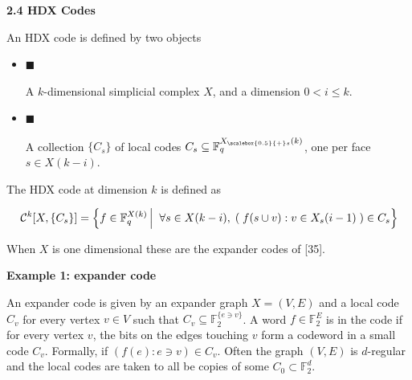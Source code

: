 \documentclass[10pt,a4paper]{article}
\begin{document}
\par\medskip\noindent\textbf{
2.4 HDX Codes}\par




An HDX code is defined by two objects\par


\begin{itemize}


\item[] 
$\blacksquare$ 


A $k$-dimensional simplicial complex $X$, and a dimension $0<i\leq k$.\par





\item[] 
$\blacksquare$ 


A collection $\{C_{s}\}$ of local codes $C_{s}\subseteq\mathbb{F}_{q}^{{X}_{\scalebox{0.5}{+}s}(k)}$, one per face $s\in X(k-i)$.\par





\end{itemize}


The HDX code at dimension $k$ is defined as\par


\[\begin{gathered}
{\cal C}^{k}[X,\{C_{s}\}]=\left\{f\in\mathbb{F}_{q}^{X(k)}\left|\;\vphantom{f\in\mathbb{F}_{q}^{X(k)}\forall s\in X(k-i),\;(\;f(s\cup v):v\in X_{s}(i-1)\;)\in C_{s}}\right.\forall s\in X(k-i),\;(\;f(s\cup v):v\in X_{s}(i-1)\;)\in C_{s}\right\}
\end{gathered}\]


When $X$ is one dimensional these are the expander codes of [35].\par




\par\medskip\noindent\textbf{Example 1: expander code}\par




An expander code is given by an expander graph $X=(V,E)$ and a local code $C_{v}$ for every vertex $v\in V$ such that $C_{v}\subseteq\mathbb{F}_{2}^{\{e\ni v\}}$. A word $f\in\mathbb{F}_{2}^{E}$ is in the code if for every vertex $v$, the bits on the edges touching $v$ form a codeword in a small code $C_{v}$. Formally, if $(f(e):e\ni v)\in C_{v}$. Often the graph $(V,E)$ is $d$-regular and the local codes are taken to all be copies of some $C_{0}\subset\mathbb{F}_{2}^{d}$.\par
\end{document}
